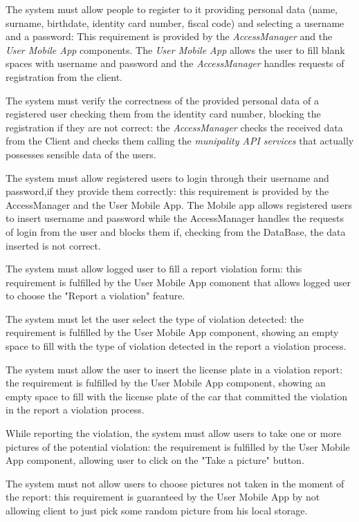 \documentclass[a4paper]{report}
\begin{document}
\begin{enumerate}[start=1,label={[R\arabic*]}]
\item The system must allow people to register to it providing personal data (name, surname, birthdate, identity card number, fiscal code) and selecting a username and a password: This requirement is provided by the \textit{AccessManager} and the \textit{User Mobile App} components. The \textit{User Mobile App} allows the user to fill blank spaces with username and password and the \textit{AccessManager} handles requests of registration from the client.
\item The system must verify the correctness of the provided personal data of a registered user checking them from the identity card number, blocking the registration if they are not correct: the \textit{AccessManager} checks the received data from the Client and checks them calling the \textit{munipality API services} that actually possesses sensible data of the users. 
\item The system must allow registered users to login through their username and password,if they provide them correctly: this requirement is provided by the AccessManager and the User Mobile App. The Mobile app allows registered users to insert username and password while the AccessManager handles the requests of login from the user and blocks them  if, checking from the DataBase, the data inserted is not correct. 
\item The system must allow logged user to fill a report violation form: this requirement is fulfilled by the User Mobile App comonent that allows logged user to choose the "Report a violation" feature.
\item The system must let the user select the type of violation detected: the requirement is fulfilled by the User Mobile App component, showing an empty space to fill with the type of violation detected in the report a violation process.
\item The system must allow the user to insert the license plate in a violation report:  the requirement is fulfilled by the User Mobile App component, showing an empty space to fill with the license plate of the car that committed the violation in the report a violation process.
\item While reporting the violation, the system must allow users to take one or more pictures of the potential violation: the requirement is fulfilled by the User Mobile App component, allowing user to click on the "Take a picture" button.
\item The system must not allow users to choose pictures not taken in the moment of the report: this requirement is guaranteed by the User Mobile App by not allowing client to just pick some random picture from his local storage.

\end{enumerate}
\end{document}
